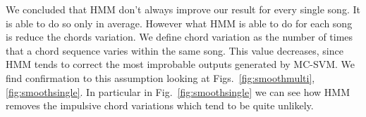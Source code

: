 %
We concluded that HMM don't always improve our result for every single song. It is able to do so only in average. However what HMM is able to do for each song is reduce the chords variation. We define chord variation as the number of times that a chord sequence varies within the same song. This value decreases, since HMM tends to correct the most improbable outputs generated by MC-SVM. We find confirmation to this assumption looking at Figs.~\ref{fig:smoothmulti},\ref{fig:smoothsingle}. In particular in Fig.~\ref{fig:smoothsingle} we can see how HMM removes the impulsive chord variations which tend to be quite unlikely.

%
